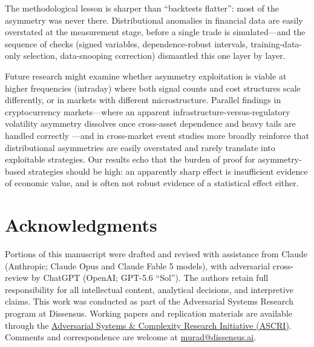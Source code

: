 \documentclass[11pt]{article}
\begin{document}
The methodological lesson is sharper than ``backtests flatter'': most of the asymmetry was never there. Distributional anomalies in financial data are easily overstated at the measurement stage, before a single trade is simulated---and the sequence of checks (signed variables, dependence-robust intervals, training-data-only selection, data-snooping correction) dismantled this one layer by layer.

Future research might examine whether asymmetry exploitation is viable at higher frequencies (intraday) where both signal counts and cost structures scale differently, or in markets with different microstructure. Parallel findings in cryptocurrency markets---where an apparent infrastructure-versus-regulatory volatility asymmetry dissolves once cross-asset dependence and heavy tails are handled correctly \citep{farzulla2026multimoment}---and in cross-market event studies more broadly \citep{farzulla2025market} reinforce that distributional asymmetries are easily overstated and rarely translate into exploitable strategies. Our results echo that the burden of proof for asymmetry-based strategies should be high: an apparently sharp effect is insufficient evidence of economic value, and is often not robust evidence of a statistical effect either.


\section*{Acknowledgments}

Portions of this manuscript were drafted and revised with assistance from Claude (Anthropic; Claude Opus and Claude Fable 5 models), with adversarial cross-review by ChatGPT (OpenAI; GPT-5.6 ``Sol''). The authors retain full responsibility for all intellectual content, analytical decisions, and interpretive claims. This work was conducted as part of the Adversarial Systems Research program at Dissensus. Working papers and replication materials are available through the \href{https://systems.ac}{Adversarial Systems \& Complexity Research Initiative (ASCRI)}. Comments and correspondence are welcome at \href{mailto:murad@dissensus.ai}{murad@dissensus.ai}.

\end{document}

